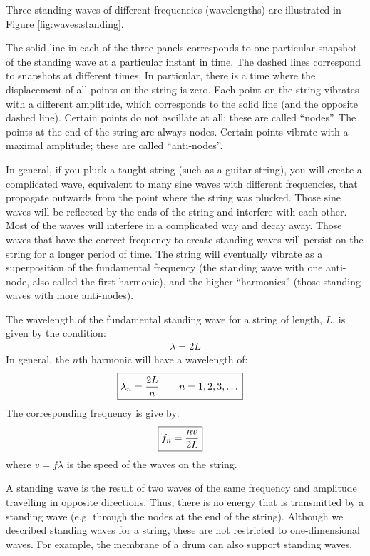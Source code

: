Three standing waves of different frequencies (wavelengths) are illustrated in Figure \ref{fig:waves:standing}.

The solid line in each of the three panels corresponds to one particular snapshot of the standing wave at a particular instant in time. The dashed lines correspond to snapshots at different times. In particular, there is a time where the displacement of all points on the string is zero. Each point on the string vibrates with a different amplitude, which corresponds to the solid line (and the opposite dashed line). Certain points do not oscillate at all; these are called ``nodes''. The points at the end of the string are always nodes. Certain points vibrate with a maximal amplitude; these are called ``anti-nodes''.

In general, if you pluck a taught string (such as a guitar string), you will create a complicated wave, equivalent to many sine waves with different frequencies, that propagate outwards from the point where the string was plucked. Those sine waves will be reflected by the ends of the string and interfere with each other. Most of the waves will interfere in a complicated way and decay away. Those waves that have the correct frequency to create standing waves will persist on the string for a longer period of time. The string will eventually vibrate as a superposition of the fundamental frequency (the standing wave with one anti-node, also called the first harmonic), and the higher ``harmonics'' (those standing waves with more anti-nodes).

The wavelength of the fundamental standing wave for a string of length, $L$, is given by the condition:
\begin{align*}
\lambda = 2L
\end{align*}
In general, the $n$th harmonic will have a wavelength of:
\begin{align}
\Aboxed{\lambda_n = \frac{2L}{n}\quad\quad n=1,2,3,\dots}
\end{align}
The corresponding frequency is give by:
\begin{align}
\Aboxed{f_n =\frac{nv}{2L}}
\end{align}
where $v=f\lambda$ is the speed of the waves on the string.

A standing wave is the result of two waves of the same frequency and amplitude travelling in opposite directions. Thus, there is no energy that is transmitted by a standing wave (e.g. through the nodes at the end of the string). Although we described standing waves for a string, these are not restricted to one-dimensional waves. For example, the membrane of a drum can also support standing waves.

